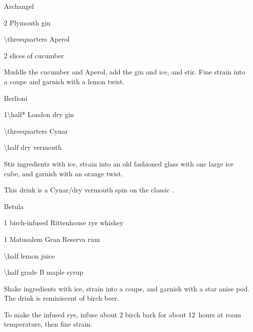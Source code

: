 \begin{PDTCocktail}{Archangel}
	\begin{Ingredients}
	\item \SI{2}{\oz} Plymouth gin
	\item \SI{\threequarters}{\oz} Aperol
	\item 2 slices of cucumber
	\end{Ingredients}
	
	\begin{Instructions}
	Muddle the cucumber and Aperol, add the gin and ice, and stir.  Fine strain into a coupe and garnish with a lemon twist.
	\end{Instructions}
\end{PDTCocktail}

\begin{PDTCocktail}{Berlioni}
	\begin{Ingredients}
	\item \SI{1\half*}{\oz} London dry gin
	\item \SI{\threequarters}{\oz} Cynar
	\item \SI{\half}{\oz} dry vermouth
	\end{Ingredients}
	
	\begin{Instructions}
	Stir ingredients with ice, strain into an old fashioned glass with one large ice cube, and garnish with an orange twist.
	
	This drink is a Cynar/dry vermouth spin on the classic \InlineCocktail*{Negroni}.
	\end{Instructions}
\end{PDTCocktail}

\begin{PDTCocktail}{Betula}
	\begin{Ingredients}
	\item \SI{1}{\oz} birch-infused Rittenhouse rye whiskey
	\item \SI{1}{\oz} Matusalem Gran Reserva rum
	\item \SI{\half}{\oz} lemon juice
	\item \SI{\half}{\oz} grade B maple syrup
	\end{Ingredients}
	
	\begin{Instructions}
	Shake ingredients with ice, strain into a coupe, and garnish with a star anise pod.  The drink is reminiscent of birch beer.
	
	To make the infused rye, infuse about \SI{2}{\oz} birch bark for about 12~hours at room temperature, then fine strain.
	\end{Instructions}
\end{PDTCocktail}

